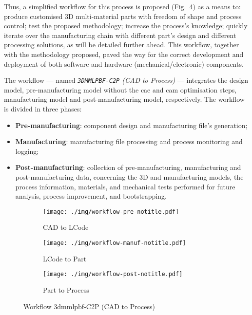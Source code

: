 Thus, a simplified workflow for this process is proposed (Fig.~\ref{fig:workflow}) as a means to: produce customised 3D multi-material parts
with freedom of shape and process control; test the proposed methodology;
increase the  process's knowledge; quickly iterate over the manufacturing chain
with different part's design and different processing solutions, as will be
detailed further ahead. This workflow, together with the methodology proposed,
paved the way for the correct development and deployment of both software and
hardware (mechanical/electronic) components.

The workflow --- named \emph{\texttt{3DMMLPBF-C2P} (CAD to Process)} --- integrates the
design model, pre-manufacturing model without the \gls{cae} and \gls{cam}
optimisation steps, manufacturing model and post-manufacturing model,
respectively.
The workflow is divided in three phases:
\begin{itemize}
\item \textbf{Pre-manufacturing}: component design and manufacturing file's generation;
\item \textbf{Manufacturing}: manufacturing file processing and process
  monitoring and logging;
\item \textbf{Post-manufacturing}: collection of pre-manufacturing,
  manufacturing and post-manufacturing data, concerning the 3D and manufacturing
  models, the process information, materials, and mechanical tests performed for
  future analysis, process improvement, and bootstrapping.
\end{itemize}

\begin{figure}[htb!]
  \centering
  \begin{subfigure}[t]{1.0\textwidth}
  \texttt{[image: ./img/workflow-pre-notitle.pdf]}
  \caption{CAD to LCode}%
  \label{fig:workflow-pre}
  \end{subfigure}
%
  \begin{subfigure}[t]{1.0\textwidth}
  \texttt{[image: ./img/workflow-manuf-notitle.pdf]}
  \caption{LCode to Part}%
  \label{fig:workflow-manuf}
\end{subfigure}
%
  \begin{subfigure}[t]{0.5\textwidth}
  \texttt{[image: ./img/workflow-post-notitle.pdf]}
  \caption{Part to Process}%
  \label{fig:workflow-post}
  \end{subfigure}
  \caption{Workflow \gls{3dmmlpbf}-C2P (CAD to Process)}%
  \label{fig:workflow}
\end{figure}
%
